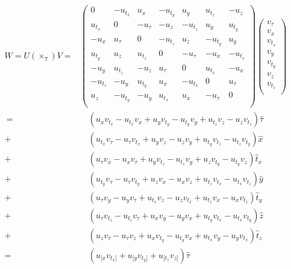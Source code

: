 \documentclass{article}
\begin{document}
\setlength{\jot}{7pt}
\begin{align*}
W = U(\times_{7})V =&
\begin{pmatrix}
0 & -u_{t_x} & u_x & -u_{t_y} & u_y & u_{t_z} & -u_z \\[1mm]
u_{t_x} & 0 & -u_\tau & -u_z & -u_{t_z} & u_y & u_{t_y} \\[1mm]
-u_x & u_\tau & 0 & -u_{t_z} & u_z & -u_{t_y} & u_y \\[1mm]
u_{t_y} & u_z & u_{t_z} & 0 & -u_\tau & -u_x & -u_{t_x} \\[1mm]
-u_y & u_{t_z} & -u_z & u_\tau & 0 & u_{t_x} & -u_x \\[1mm]
-u_{t_z} & -u_y & u_{t_y} & u_x & -u_{t_x} & 0 & u_\tau \\[1mm]
u_z & -u_{t_y} & -u_y & u_{t_x} & u_x & -u_\tau & 0 \\[1mm]
\end{pmatrix}
\begin{pmatrix}
v_\tau  \\[1mm]
v_x \\[1mm]
v_{t_x} \\[1mm]
v_y \\[1mm]
v_{t_y} \\[1mm]
v_z \\[1mm]
v_{t_z} \\[1mm]
\end{pmatrix}\\[3mm]
\
=& \quad (u_x v_{t_x} - u_{t_x} v_x  + u_y v_{t_y} - u_{t_y} v_y + u_{t_z} v_z  - u_z v_{t_z}) \hat \tau \\
+& \quad (u_{t_x} v_\tau - u_\tau v_{t_x} + u_y v_z - u_z v_y  + u_{t_y} v_{t_z} - u_{t_z} v_{t_y}) \hat x \\
+& \quad (u_\tau v_x - u_x v_\tau + u_y v_{t_z} - u_{t_z} v_y + u_z v_{t_y} - u_{t_y} v_z) \hat t_x \\
+& \quad (u_{t_y} v_\tau - u_\tau v_{t_y} + u_z v_x - u_x v_z + u_{t_z} v_{t_x} - u_{t_x} v_{t_z}) \hat y \\  \tag{FORM 1}
+& \quad (u_\tau v_y - u_y v_\tau + u_{t_x} v_z - u_z v_{t_x} + u_{t_z} v_x - u_x v_{t_z}) \hat t_y \\
+& \quad (u_\tau v_{t_z} - u_{t_z} v_\tau + u_x v_y - u_y v_x + u_{t_y} v_{t_x} - u_{t_x} v_{t_y}) \hat z \\
+& \quad (u_z v_\tau - u_\tau v_z + u_x v_{t_y} - u_{t_y} v_x + u_{t_x} v_y - u_y v_{t_x}) \hat t_z \\[3mm]
=& \quad (u_{[x}v_{t_x]}  + u_{[y} v_{t_y]} + u_{[t_z} v_{z]}) \hat \tau \\

\end{align*}
\end{document}
